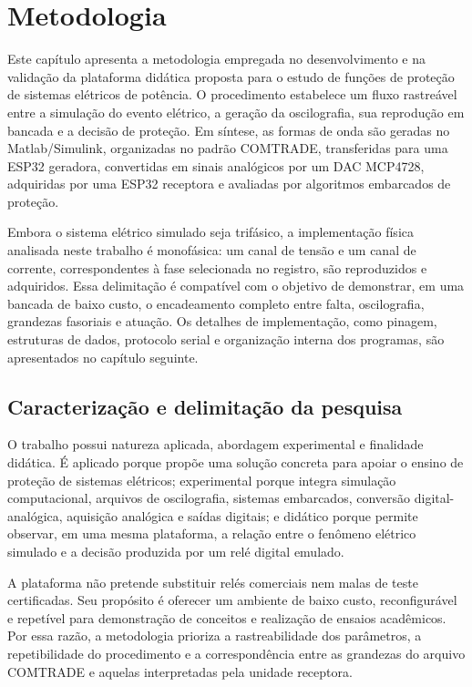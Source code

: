 \chapter{Metodologia}

Este capítulo apresenta a metodologia empregada no desenvolvimento e na validação da plataforma didática proposta para o estudo de funções de proteção de sistemas elétricos de potência. O procedimento estabelece um fluxo rastreável entre a simulação do evento elétrico, a geração da oscilografia, sua reprodução em bancada e a decisão de proteção. Em síntese, as formas de onda são geradas no Matlab/Simulink, organizadas no padrão COMTRADE, transferidas para uma ESP32 geradora, convertidas em sinais analógicos por um DAC MCP4728, adquiridas por uma ESP32 receptora e avaliadas por algoritmos embarcados de proteção.

Embora o sistema elétrico simulado seja trifásico, a implementação física analisada neste trabalho é monofásica: um canal de tensão e um canal de corrente, correspondentes à fase selecionada no registro, são reproduzidos e adquiridos. Essa delimitação é compatível com o objetivo de demonstrar, em uma bancada de baixo custo, o encadeamento completo entre falta, oscilografia, grandezas fasoriais e atuação. Os detalhes de implementação, como pinagem, estruturas de dados, protocolo serial e organização interna dos programas, são apresentados no capítulo seguinte.

\section{Caracterização e delimitação da pesquisa}

O trabalho possui natureza aplicada, abordagem experimental e finalidade didática. É aplicado porque propõe uma solução concreta para apoiar o ensino de proteção de sistemas elétricos; experimental porque integra simulação computacional, arquivos de oscilografia, sistemas embarcados, conversão digital-analógica, aquisição analógica e saídas digitais; e didático porque permite observar, em uma mesma plataforma, a relação entre o fenômeno elétrico simulado e a decisão produzida por um relé digital emulado.

A plataforma não pretende substituir relés comerciais nem malas de teste certificadas. Seu propósito é oferecer um ambiente de baixo custo, reconfigurável e repetível para demonstração de conceitos e realização de ensaios acadêmicos. Por essa razão, a metodologia prioriza a rastreabilidade dos parâmetros, a repetibilidade do procedimento e a correspondência entre as grandezas do arquivo COMTRADE e aquelas interpretadas pela unidade receptora.


